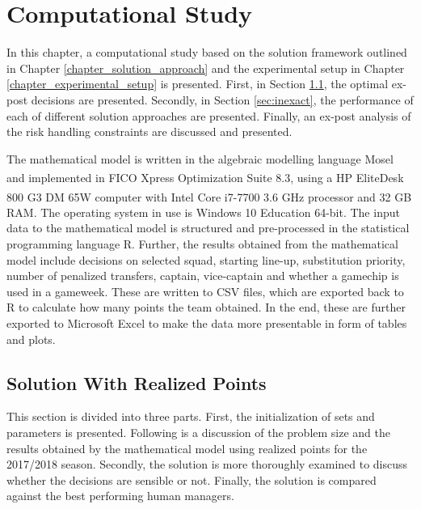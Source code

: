 
\chapter{Computational Study} \label{chapter_computational_study}


In this chapter, a computational study based on the solution framework outlined in Chapter \ref{chapter_solution_approach} and the experimental setup in Chapter \ref{chapter_experimental_setup} is presented. First, in Section \ref{sec:exact}, the optimal ex-post decisions are presented. Secondly, in Section \ref{sec:inexact}, the performance of each of different solution approaches are presented. Finally, an ex-post analysis of the risk handling constraints are discussed and presented. 

\newpar

The mathematical model is written in the algebraic modelling language Mosel and implemented in FICO\textsuperscript {\textregistered} Xpress Optimization Suite 8.3, using a HP EliteDesk 800 G3 DM 65W computer with Intel\textsuperscript{\textregistered} Core\textsuperscript{\texttrademark} i7-7700 3.6 GHz processor and 32 GB RAM. The operating system in use is Windows 10 Education 64-bit. The input data to the mathematical model is structured and pre-processed in the statistical programming language R. Further, the results obtained from the mathematical model include decisions on selected squad, starting line-up, substitution priority, number of penalized transfers, captain, vice-captain and whether a gamechip is used in a gameweek. These are written to CSV files, which are exported back to R to calculate how many points the team obtained. In the end, these are further exported to Microsoft Excel to make the data more presentable in form of tables and plots. 

\section{Solution With Realized Points}\label{sec:exact}
This section is divided into three parts. First, the initialization of sets and parameters is presented. Following is a discussion of the problem size and the results obtained by the mathematical model using realized points for the 2017/2018 season. Secondly, the solution is more thoroughly examined to discuss whether the decisions are sensible or not. Finally, the solution is compared against the best performing human managers. 



